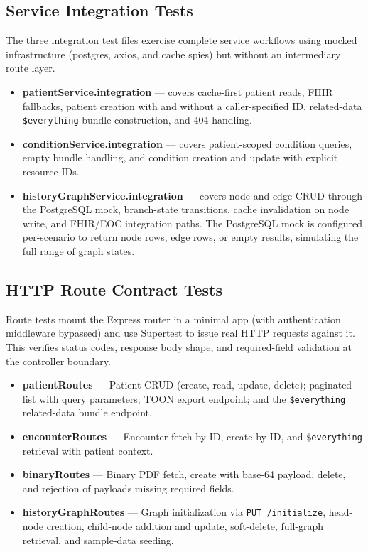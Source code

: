 \subsection{Service Integration Tests}

The three integration test files exercise complete service workflows using mocked
infrastructure (postgres, axios, and cache spies) but without an intermediary
route layer.

\begin{itemize}
  \item \textbf{patientService.integration} --- covers cache-first patient reads,
        FHIR fallbacks, patient creation with and without a caller-specified ID,
        related-data \texttt{\$everything} bundle construction, and 404 handling.
  \item \textbf{conditionService.integration} --- covers patient-scoped condition
        queries, empty bundle handling, and condition creation and update with
        explicit resource IDs.
  \item \textbf{historyGraphService.integration} --- covers node and edge CRUD
        through the PostgreSQL mock, branch-state transitions, cache invalidation
        on node write, and FHIR/EOC integration paths. The PostgreSQL mock is
        configured per-scenario to return node rows, edge rows, or empty results,
        simulating the full range of graph states.
\end{itemize}

\subsection{HTTP Route Contract Tests}

Route tests mount the Express router in a minimal app (with authentication
middleware bypassed) and use Supertest to issue real HTTP requests against it.
This verifies status codes, response body shape, and required-field validation
at the controller boundary.

\begin{itemize}
  \item \textbf{patientRoutes} --- Patient CRUD (create, read, update, delete);
        paginated list with query parameters; TOON export endpoint; and the
        \texttt{\$everything} related-data bundle endpoint.
  \item \textbf{encounterRoutes} --- Encounter fetch by ID, create-by-ID, and
        \texttt{\$everything} retrieval with patient context.
  \item \textbf{binaryRoutes} --- Binary PDF fetch, create with base-64 payload,
        delete, and rejection of payloads missing required fields.
  \item \textbf{historyGraphRoutes} --- Graph initialization via
        \texttt{PUT /initialize}, head-node creation, child-node addition and
        update, soft-delete, full-graph retrieval, and sample-data seeding.
\end{itemize}

